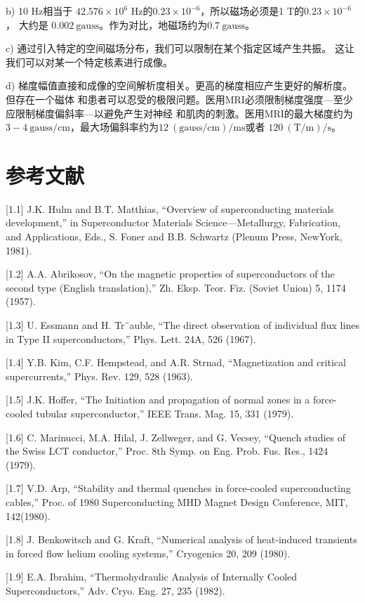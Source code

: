 b) 10 Hz相当于 $42.576×10^6$ Hz的$0.23×10^{−6}$，所以磁场必须是1 T的$0.23×10^{−6}$ ，
大约是 $0.002\ \mathrm{gauss}$。作为对比，地磁场约为$0.7 \ \mathrm{gauss}$。

c) 通过引入特定的空间磁场分布，我们可以限制在某个指定区域产生共振。
这让我们可以对某一个特定核素进行成像。

d) 梯度幅值直接和成像的空间解析度相关。更高的梯度相应产生更好的解析度。但存在一个磁体
和患者可以忍受的极限问题。医用MRI必须限制梯度强度---至少应限制梯度偏斜率---以避免产生对神经
和肌肉的刺激。医用MRI的最大梯度约为$3-4 \ \mathrm{gauss/cm}$，最大场偏斜率约为$12\ \mathrm{(gauss/cm)/ms}$或者
$120\ \mathrm{(T/m)/s}$。

\section*{参考文献}
[1.1] J.K. Hulm and B.T. Matthias, “Overview of superconducting materials development,”
in Superconductor Materials Science—Metallurgy, Fabrication, and Applications,
Eds., S. Foner and B.B. Schwartz (Plenum Press, NewYork, 1981).

[1.2] A.A. Abrikosov, “On the magnetic properties of superconductors of the second
type (English translation),” Zh. Eksp. Teor. Fiz. (Soviet Union) 5, 1174 (1957).

[1.3] U. Essmann and H. Tr¨auble, “The direct observation of individual flux lines in
Type II superconductors,” Phys. Lett. 24A, 526 (1967).

[1.4] Y.B. Kim, C.F. Hempstead, and A.R. Strnad, “Magnetization and critical supercurrents,” Phys. Rev. 129, 528 (1963).

[1.5] J.K. Hoffer, “The Initiation and propagation of normal zones in a force-cooled
tubular superconductor,” IEEE Trans. Mag. 15, 331 (1979).

[1.6] C. Marinucci, M.A. Hilal, J. Zellweger, and G. Vecsey, “Quench studies of the
Swiss LCT conductor,” Proc. 8th Symp. on Eng. Prob. Fus. Res., 1424 (1979).

[1.7] V.D. Arp, “Stability and thermal quenches in force-cooled superconducting cables,”
Proc. of 1980 Superconducting MHD Magnet Design Conference, MIT, 142(1980).

[1.8] J. Benkowitsch and G. Kraft, “Numerical analysis of heat-induced transients in
forced flow helium cooling systems,” Cryogenics 20, 209 (1980).

[1.9] E.A. Ibrahim, “Thermohydraulic Analysis of Internally Cooled Superconductors,”
Adv. Cryo. Eng. 27, 235 (1982).

